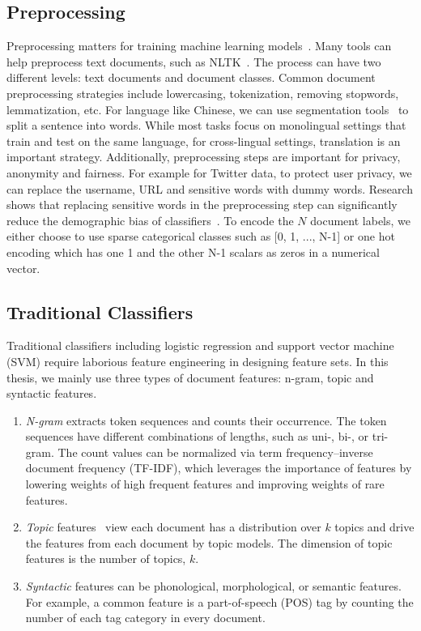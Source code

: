 \subsection{Preprocessing}
Preprocessing matters for training machine learning models~\cite{camacho2018role,huang2019matters}.
Many tools can help preprocess text documents, such as NLTK~\cite{bird2004nltk}.
The process can have two different levels: text documents and document classes.
Common document preprocessing strategies include lowercasing, tokenization, removing stopwords, lemmatization, etc.
For language like Chinese, we can use segmentation tools~\cite{sun2012jieba} to split a sentence into words.
While most tasks focus on monolingual settings that train and test on the same language, for cross-lingual settings, translation is an important strategy.
Additionally, preprocessing steps are important for privacy, anonymity and fairness. 
For example for Twitter data, to protect user privacy, we can replace the username, URL and sensitive words with dummy words. 
Research shows that replacing sensitive words in the preprocessing step can significantly reduce the demographic bias of classifiers~\cite{dixon2018measuring}.
To encode the $N$ document labels, we either choose to use sparse categorical classes such as [0, 1, ..., N-1] or one hot encoding which has one 1 and the other N-1 scalars as zeros in a numerical vector. 


\subsection{Traditional Classifiers}

Traditional classifiers including logistic regression and support vector machine (SVM) require laborious feature engineering in designing feature sets.
In this thesis, we mainly use three types of document features: n-gram, topic and syntactic features.

\begin{enumerate}
\item \textit{N-gram} extracts token sequences and counts their occurrence. The token sequences have different combinations of lengths, such as uni-, bi-, or tri-gram. The count values can be normalized via term frequency–inverse document frequency (TF-IDF), which leverages the importance of features by lowering weights of high frequent features and improving weights of rare features.
\item \textit{Topic} features~\cite{blei2003latent} view each document has a distribution over $k$ topics and drive the features from each document by topic models. The dimension of topic features is the number of topics, $k$. 
\item \textit{Syntactic} features can be phonological, morphological, or semantic features. For example, a common feature is a part-of-speech (POS) tag by counting the number of each tag category in every document. 
\end{enumerate}  


